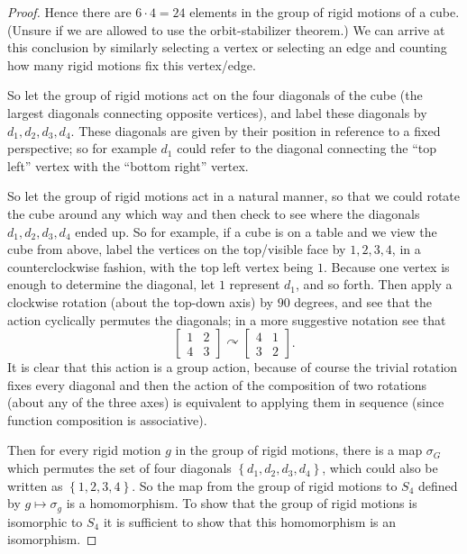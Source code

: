 \documentclass[11pt]{article}
\newcommand{\cbr}[1]{\left\{#1\right\}}
\begin{document}
\begin{enumerate}
\begin{proof}
      Hence there are $6\cdot 4 = 24$ elements in the group of rigid motions of a cube. (Unsure if we are allowed to use the orbit-stabilizer theorem.) We can arrive at this conclusion by similarly selecting a vertex or selecting an edge and counting how many rigid motions fix this vertex/edge.
      
      So let the group of rigid motions act on the four diagonals of the cube (the largest diagonals connecting opposite vertices), and label these diagonals by $d_1,d_2,d_3,d_4$. These diagonals are given by their position in reference to a fixed perspective; so for example $d_1$ could refer to the diagonal connecting the ``top left'' vertex with the ``bottom right'' vertex. 

      So let the group of rigid motions act in a natural manner, so that we could rotate the cube around any which way and then check to see where the diagonals $d_1,d_2,d_3,d_4$ ended up. So for example, if a cube is on a table and we view the cube from above, label the vertices on the top/visible face by $1,2,3,4$, in a counterclockwise fashion, with the top left vertex being $1$. Because one vertex is enough to determine the diagonal, let $1$ represent $d_1$, and so forth. Then apply a clockwise rotation (about the top-down axis) by $90$ degrees, and see that the action cyclically permutes the diagonals; in a more suggestive notation see that \[\begin{bmatrix}
        1 & 2 \\ 4 & 3
      \end{bmatrix} \curvearrowright \begin{bmatrix}
        4 & 1 \\ 3 & 2
      \end{bmatrix}.\]
      It is clear that this action is a group action, because of course the trivial rotation fixes every diagonal and then the action of the composition of two rotations (about any of the three axes) is equivalent to applying them in sequence (since function composition is associative).

      Then for every rigid motion $g$ in the group of rigid motions, there is a map $\sigma_G$ which permutes the set of four diagonals $\cbr{d_1,d_2,d_3,d_4}$, which could also be written as $\cbr{1,2,3,4}$. So the map from the group of rigid motions to $S_4$ defined by $g\mapsto \sigma_g$ is a homomorphism. To show that the group of rigid motions is isomorphic to $S_4$ it is sufficient to show that this homomorphism is an isomorphism.


\end{proof}
\end{enumerate}
\end{document}
